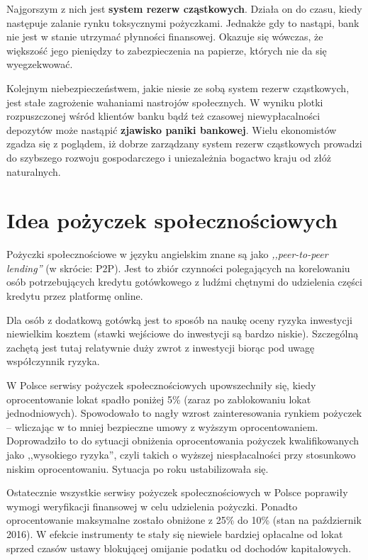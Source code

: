 \documentclass[a4paper,twoside,titlepage,openright]{book}
\begin{document}
Najgorszym z nich jest \textbf{system rezerw cząstkowych}. Działa on do czasu, kiedy następuje zalanie rynku toksycznymi pożyczkami. Jednakże gdy to nastąpi, bank nie jest w stanie utrzymać płynności finansowej. Okazuje się wówczas, że większość jego pieniędzy to zabezpieczenia na papierze, których nie da się wyegzekwować. 

Kolejnym niebezpieczeństwem, jakie niesie ze sobą system rezerw cząstkowych, jest stałe zagrożenie wahaniami nastrojów społecznych. W wyniku plotki rozpuszczonej wśród klientów banku bądź też czasowej niewypłacalności depozytów może nastąpić \textbf{zjawisko paniki bankowej}. Wielu ekonomistów zgadza się z poglądem, iż dobrze zarządzany system rezerw cząstkowych prowadzi do szybszego rozwoju gospodarczego i uniezależnia bogactwo kraju od złóż naturalnych.\cite{fractionalReserveBanking}

\section{Idea pożyczek społecznościowych}
Pożyczki społecznościowe w języku angielskim znane są jako \textit{,,peer-to-peer lending''} (w skrócie: P2P). Jest to zbiór czynności polegających na korelowaniu osób potrzebujących kredytu gotówkowego z ludźmi chętnymi do udzielenia części kredytu przez platformę online.\cite{P2P} 

Dla osób z dodatkową gotówką jest to sposób na naukę oceny ryzyka inwestycji niewielkim kosztem (stawki wejściowe do inwestycji są bardzo niskie). Szczególną zachętą jest tutaj relatywnie duży zwrot z inwestycji biorąc pod uwagę współczynnik ryzyka. 

W Polsce serwisy pożyczek społecznościowych upowszechniły się, kiedy oprocentowanie lokat spadło poniżej 5\% (zaraz po zablokowaniu lokat jednodniowych).\cite{antybelkowe} Spowodowało to nagły wzrost zainteresowania rynkiem pożyczek -- wliczając w to mniej bezpieczne umowy z wyższym oprocentowaniem. Doprowadziło to do sytuacji obniżenia oprocentowania pożyczek kwalifikowanych jako ,,wysokiego ryzyka'', czyli takich o wyższej niespłacalności przy stosunkowo niskim oprocentowaniu. Sytuacja po roku ustabilizowała się. 

Ostatecznie wszystkie serwisy pożyczek społecznościowych w Polsce poprawiły wymogi weryfikacji finansowej w celu udzielenia pożyczki. Ponadto oprocentowanie maksymalne zostało obniżone z 25\% do 10\% (stan na październik 2016). W efekcie instrumenty te stały się niewiele bardziej opłacalne od lokat sprzed czasów ustawy blokującej omijanie podatku od dochodów kapitałowych.
 
\end{document}

